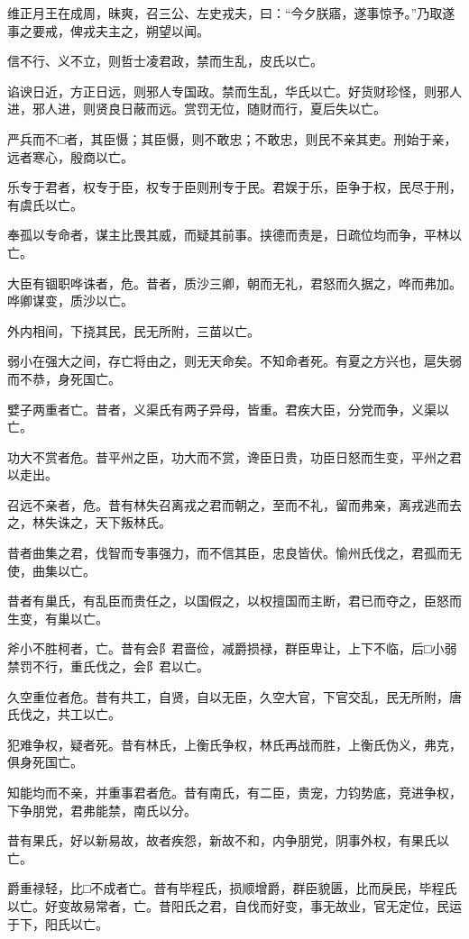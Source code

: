\documentclass[]{article}
\begin{document}
维正月王在成周，昧爽，召三公、左史戎夫，曰：``今夕朕寤，遂事惊予。''乃取遂事之要戒，俾戎夫主之，朔望以闻。

信不行、义不立，则哲士凌君政，禁而生乱，皮氏以亡。

谄谀日近，方正日远，则邪人专国政。禁而生乱，华氏以亡。好货财珍怪，则邪人进，邪人进，则贤良日蔽而远。赏罚无位，随财而行，夏后失以亡。

严兵而不□者，其臣慑；其臣慑，则不敢忠；不敢忠，则民不亲其吏。刑始于亲，远者寒心，殷商以亡。

乐专于君者，权专于臣，权专于臣则刑专于民。君娱于乐，臣争于权，民尽于刑，有虞氏以亡。

奉孤以专命者，谋主比畏其威，而疑其前事。挟德而责是，日疏位均而争，平林以亡。

大臣有锢职哗诛者，危。昔者，质沙三卿，朝而无礼，君怒而久据之，哗而弗加。哗卿谋变，质沙以亡。

外内相间，下挠其民，民无所附，三苗以亡。

弱小在强大之间，存亡将由之，则无天命矣。不知命者死。有夏之方兴也，扈失弱而不恭，身死国亡。

嬖子两重者亡。昔者，义渠氏有两子异母，皆重。君疾大臣，分党而争，义渠以亡。

功大不赏者危。昔平州之臣，功大而不赏，谗臣日贵，功臣日怒而生变，平州之君以走出。

召远不亲者，危。昔有林失召离戎之君而朝之，至而不礼，留而弗亲，离戎逃而去之，林失诛之，天下叛林氏。

昔者曲集之君，伐智而专事强力，而不信其臣，忠良皆伏。愉州氏伐之，君孤而无使，曲集以亡。

昔者有巢氏，有乱臣而贵任之，以国假之，以权擅国而主断，君已而夺之，臣怒而生变，有巢以亡。

斧小不胜柯者，亡。昔有会阝君啬俭，减爵损禄，群臣卑让，上下不临，后□小弱禁罚不行，重氏伐之，会阝君以亡。

久空重位者危。昔有共工，自贤，自以无臣，久空大官，下官交乱，民无所附，唐氏伐之，共工以亡。

犯难争权，疑者死。昔有林氏，上衡氏争权，林氏再战而胜，上衡氏伪义，弗克，俱身死国亡。

知能均而不亲，并重事君者危。昔有南氏，有二臣，贵宠，力钧势底，竞进争权，下争朋党，君弗能禁，南氏以分。

昔有果氏，好以新易故，故者疾怨，新故不和，内争朋党，阴事外权，有果氏以亡。

爵重禄轻，比□不成者亡。昔有毕程氏，损顺增爵，群臣貌匮，比而戾民，毕程氏以亡。好变故易常者，亡。昔阳氏之君，自伐而好变，事无故业，官无定位，民运于下，阳氏以亡。
\end{document}
